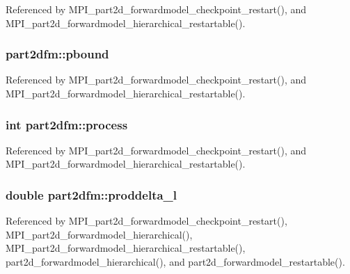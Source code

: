 Referenced by M\+P\+I\+\_\+part2d\+\_\+forwardmodel\+\_\+checkpoint\+\_\+restart(), and M\+P\+I\+\_\+part2d\+\_\+forwardmodel\+\_\+hierarchical\+\_\+restartable().

\subsubsection[{\texorpdfstring{pbound}{pbound}}]{ part2dfm\+::pbound}\hypertarget{structpart2dfm_ab583315c812c76131356179513b0d8a4}{}\label{structpart2dfm_ab583315c812c76131356179513b0d8a4}


Referenced by M\+P\+I\+\_\+part2d\+\_\+forwardmodel\+\_\+checkpoint\+\_\+restart(), and M\+P\+I\+\_\+part2d\+\_\+forwardmodel\+\_\+hierarchical\+\_\+restartable().

\subsubsection[{\texorpdfstring{process}{process}}]{\setlength{\rightskip}{0pt plus 5cm}int part2dfm\+::process}\hypertarget{structpart2dfm_af7c2d037e638e6ee8bfee2ba6af2463e}{}\label{structpart2dfm_af7c2d037e638e6ee8bfee2ba6af2463e}


Referenced by M\+P\+I\+\_\+part2d\+\_\+forwardmodel\+\_\+checkpoint\+\_\+restart(), and M\+P\+I\+\_\+part2d\+\_\+forwardmodel\+\_\+hierarchical\+\_\+restartable().

\subsubsection[{\texorpdfstring{proddelta\+\_\+l}{proddelta_l}}]{\setlength{\rightskip}{0pt plus 5cm}double part2dfm\+::proddelta\+\_\+l}\hypertarget{structpart2dfm_a9bfafdf80c5638f7b413108129a968d7}{}\label{structpart2dfm_a9bfafdf80c5638f7b413108129a968d7}


Referenced by M\+P\+I\+\_\+part2d\+\_\+forwardmodel\+\_\+checkpoint\+\_\+restart(), M\+P\+I\+\_\+part2d\+\_\+forwardmodel\+\_\+hierarchical(), M\+P\+I\+\_\+part2d\+\_\+forwardmodel\+\_\+hierarchical\+\_\+restartable(), part2d\+\_\+forwardmodel\+\_\+hierarchical(), and part2d\+\_\+forwardmodel\+\_\+restartable().

